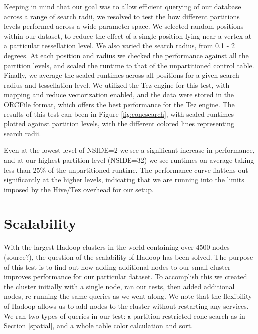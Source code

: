 \documentclass[11pt,twoside]{article}
\begin{document}
Keeping in mind that our goal was to allow efficient querying of our database across a range of search radii, we resolved to test the how different partitions levels performed across a wide parameter space.  We selected random positions within our dataset, to reduce the effect of a single position lying near a vertex at a particular tessellation level.  We also varied the search radius, from 0.1 - 2 degrees.  At each position and radius we checked the performance against all the partition levels, and scaled the runtime to that of the unpartitioned control table.  Finally, we average the scaled runtimes across all positions for a given search radius and tessellation level.   We utilized the Tez engine for this test, with mapping and reduce vectorization enabled, and the data were stored in the ORCFile format, which offers the best performance for the Tez engine.  The results of this test can been in Figure \ref{fig:conesearch}, with scaled runtimes plotted against partition levels, with the different colored lines representing search radii.  



Even at the lowest level of NSIDE=2 we see a significant increase in performance, and at our highest partition level (NSIDE=32) we see runtimes on average taking less than 25\% of the unpartitioned runtime.  The performance curve flattens out significantly at the higher levels, indicating that we are running into the limits imposed by the Hive/Tez overhead for our setup. 

\section{Scalability}
With the largest Hadoop clusters in the world containing over 4500 nodes (source?), the question of the scalability of Hadoop has been solved.  The purpose of this test is to find out how adding additional nodes to our small cluster improves performance for our particular dataset.  To accomplish this we created the cluster initially with a single node, ran our tests, then added additional nodes, re-running the same queries as we went along.  We note that the flexibility of Hadoop allows us to add nodes to the cluster without restarting any services.  We ran two types of queries in our test:  a partition restricted cone search as in Section \ref{spatial}, and a whole table color calculation and sort.  
\end{document}
